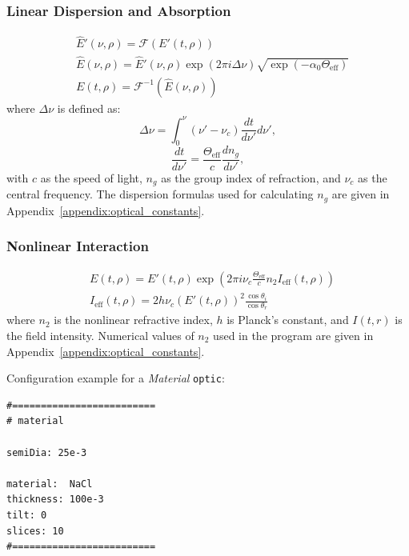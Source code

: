 \documentclass{report}
\begin{document}
\subsubsection{Linear Dispersion and Absorption}
\begin{equation}
 \begin{aligned}
  &\widehat{E}'(\nu,\rho) = \mathcal{F}(E'(t,\rho))\\
  &\widehat{E}(\nu,\rho) = \widehat{E}'(\nu,\rho) \exp (2 \pi i \Delta \nu) \sqrt{\exp(-\alpha_0 \Theta_{\text{eff}})}\\
  &E(t,\rho) = \mathcal{F}^{-1}(\widehat{E}(\nu,\rho))
 \end{aligned}
\end{equation}
where \(\Delta \nu\) is defined as:
\begin{equation}\label{eq:Delta_nu_disp}
 \Delta \nu = \int_0^{\nu} (\nu'-\nu_c) \frac{dt}{d\nu'} d\nu',
\end{equation}
\begin{equation}
 \frac{dt}{d\nu'} = \frac{\Theta_{\text{eff}}}{c} \frac{dn_{g}}{d\nu'},
\end{equation}
with \(c\) as the speed of light, \(n_{g}\) as the group index of refraction, and \(\nu_c\) as the central frequency. The dispersion formulas used for calculating \(n_{g}\) are given in Appendix~\ref{appendix:optical_constants}.

\subsubsection{Nonlinear Interaction}
\begin{equation}
 \begin{aligned}
  &E(t,\rho) = E'(t,\rho) \exp\left(2\pi i \nu_c \frac{\Theta_{\text{eff}}}{c} n_2 I_{\text{eff}}(t,\rho)\right)\\
  &I_{\text{eff}}(t,\rho) = 2 h \nu_c (E'(t,\rho))^2 \frac{\cos\theta_i} {\cos\theta_r}
 \end{aligned}
\end{equation}
where \(n_2\) is the nonlinear refractive index, \(h\) is Planck's constant, and \(I(t,r)\) is the field intensity. Numerical values of \(n_2\) used in the program are given in Appendix~\ref{appendix:optical_constants}.

Configuration example for a \textit{Material} \texttt{optic}:

\begin{verbatim}
#=========================
# material

semiDia: 25e-3

material:  NaCl
thickness: 100e-3
tilt: 0
slices: 10
#=========================
\end{verbatim}
\end{document}
